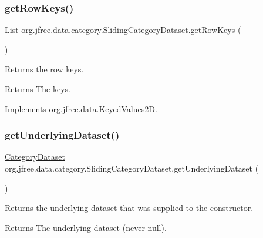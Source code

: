 \subsubsection{\texorpdfstring{get\+Row\+Keys()}{getRowKeys()}}
{\footnotesize\ttfamily List org.\+jfree.\+data.\+category.\+Sliding\+Category\+Dataset.\+get\+Row\+Keys (\begin{DoxyParamCaption}{ }\end{DoxyParamCaption})}

Returns the row keys.

\begin{DoxyReturn}{Returns}
The keys. 
\end{DoxyReturn}


Implements \mbox{\hyperlink{interfaceorg_1_1jfree_1_1data_1_1_keyed_values2_d_aeda9aab284e61f69ca6e81370e76f70a}{org.\+jfree.\+data.\+Keyed\+Values2D}}.

\mbox{\label{classorg_1_1jfree_1_1data_1_1category_1_1_sliding_category_dataset_af4ec01422ac8a4ad9201097f359b5a78}} 
\subsubsection{\texorpdfstring{get\+Underlying\+Dataset()}{getUnderlyingDataset()}}
{\footnotesize\ttfamily \mbox{\hyperlink{interfaceorg_1_1jfree_1_1data_1_1category_1_1_category_dataset}{Category\+Dataset}} org.\+jfree.\+data.\+category.\+Sliding\+Category\+Dataset.\+get\+Underlying\+Dataset (\begin{DoxyParamCaption}{ }\end{DoxyParamCaption})}

Returns the underlying dataset that was supplied to the constructor.

\begin{DoxyReturn}{Returns}
The underlying dataset (never {\ttfamily null}). 
\end{DoxyReturn}
\mbox{\label{classorg_1_1jfree_1_1data_1_1category_1_1_sliding_category_dataset_a18db7dd73ce5bd7e83174d8bc2db6e80}} 

